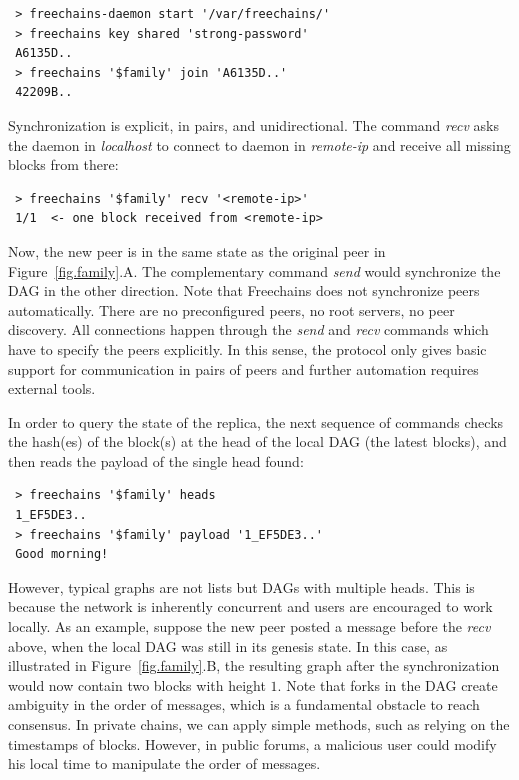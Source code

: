 \documentclass[10pt,journal,compsoc]{IEEEtran}
\newcommand{\FC}       {Freechains\xspace}
\begin{document}
{\footnotesize
\begin{verbatim}
 > freechains-daemon start '/var/freechains/'
 > freechains key shared 'strong-password'
 A6135D..
 > freechains '$family' join 'A6135D..'
 42209B..
\end{verbatim}
}

Synchronization is explicit, in pairs, and unidirectional.
The command \emph{recv} asks the daemon in \emph{localhost} to connect to
daemon in \emph{remote-ip} and receive all missing blocks from there:

{\footnotesize
\begin{verbatim}
 > freechains '$family' recv '<remote-ip>'
 1/1  <- one block received from <remote-ip>
\end{verbatim}
}

Now, the new peer is in the same state as the original peer in
Figure~\ref{fig.family}.A.
The complementary command \emph{send} would synchronize the DAG in the other
direction.
Note that \FC does not synchronize peers automatically.
There are no preconfigured peers, no root servers, no peer discovery.
All connections happen through the \emph{send} and \emph{recv} commands which
have to specify the peers explicitly.
In this sense, the protocol only gives basic support for communication in pairs
of peers and further automation requires external tools.

In order to query the state of the replica, the next sequence of commands
checks the hash(es) of the block(s) at the head of the local DAG (the latest
blocks), and then reads the payload of the single head found:


{\footnotesize
\begin{verbatim}
 > freechains '$family' heads
 1_EF5DE3..
 > freechains '$family' payload '1_EF5DE3..'
 Good morning!
\end{verbatim}
}

However, typical graphs are not lists but DAGs with multiple heads.
This is because the network is inherently concurrent and users are encouraged
to work locally.
As an example, suppose the new peer posted a message before the \emph{recv}
above, when the local DAG was still in its genesis state.
In this case, as illustrated in Figure~\ref{fig.family}.B, the resulting graph
after the synchronization would now contain two blocks with height $1$.
%
Note that forks in the DAG create ambiguity in the order of messages, which is
a fundamental obstacle to reach consensus.
In private chains, we can apply simple methods, such as relying on the
timestamps of blocks.
However, in public forums, a malicious user could modify his local time to
manipulate the order of messages.
\end{document}
